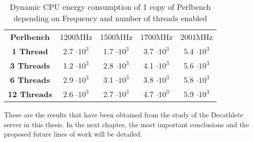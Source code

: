 \begin{table}[H]
\begin{center}
\begin{tabular}{ccccc}
  \bf Perlbench &  1200MHz & 1500MHz & 1700MHz & 2001MHz \\
  \bf 1 Thread &  2.7 $\cdot {10}^{3}$ & 1.7 $\cdot {10}^{3}$ & 3.7 $\cdot {10}^{3}$ & 5.4 $\cdot {10}^{3}$ \\
  \bf 3 Threads &  1.2 $\cdot {10}^{3}$ & 2.8 $\cdot {10}^{3}$ & 4.1 $\cdot {10}^{3}$ & 5.6 $\cdot {10}^{3}$ \\
  \bf 6 Threads & 2.9 $\cdot {10}^{3}$ & 3.1 $\cdot {10}^{3}$ & 3.8 $\cdot {10}^{3}$ & 5.8 $\cdot {10}^{3}$ \\
  \bf 12 Threads &  2.6 $\cdot {10}^{3}$ & 2.7 $\cdot {10}^{3}$ & 4.7 $\cdot {10}^{3}$ & 5.9 $\cdot {10}^{3}$ \\

\end{tabular}
\end{center}
\caption{Dynamic CPU energy consumption of 1 copy of Perlbench depending on Frequency and number of threads enabled }
\label{tab:energCompdyn}
\end{table}

These are the results that have been obtained from the study of the Decathlete server in this thesis. In the next chapter, the most important conclusions and the proposed future lines of work will be detailed.